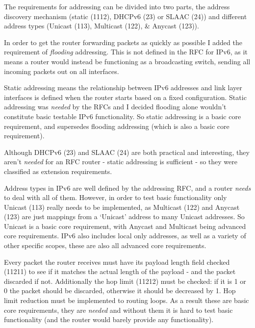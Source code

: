 \documentclass[12pt,a4paper,twoside,openany]{report}
\begin{document}
\bigskip

The requirements for addressing can be divided into two parts, the address discovery mechanism (static (1112), DHCPv6\cite{dhcpv6_rfc} (23) or SLAAC\cite{slaac_rfc} (24)) and different address types (Unicast (113), Multicast (122), \& Anycast (123)).  

In order to get the router forwarding packets as quickly as possible I added the requirement of \textit{flooding} addressing.  This is not defined in the RFC for IPv6, as it means a router would instead be functioning as a broadcasting switch, sending all incoming packets out on all interfaces.

Static addressing means the relationship between IPv6 addresses and link layer interfaces is defined when the router starts based on a fixed configuration.  Static addressing was \textit{needed} by the RFCs and I decided flooding alone wouldn't constitute basic testable IPv6 functionality. So static addressing is a basic core requirement, and supersedes flooding addressing (which is also a basic core requirement).

Although DHCPv6 (23) and SLAAC (24) are both practical and interesting, they aren't \textit{needed} for an RFC router - static addressing is sufficient - so they were classified as extension requirements.  

Address types in IPv6 are well defined by the addressing RFC\cite{ipv6_rfc_adr}, and a router \textit{needs} to deal with all of them.  However, in order to test basic functionality only Unicast (113) really needs to be implemented, as Multicast (122) and Anycast (123) are just mappings from a `Unicast' address to many Unicast addresses. So Unicast is a basic core requirement, with Anycast and Multicast being advanced core requirements. IPv6 also includes local only addresses, as well as a variety of other specific scopes, these are also all advanced core requirements.

\bigskip

Every packet the router receives must have its payload length field checked (11211) to see if it matches the actual length of the payload - and the packet discarded if not.  Additionally the hop limit (11212) must be checked: if it is 1 or 0 the packet should be discarded, otherwise it should be decreased by 1. Hop limit reduction must be implemented to routing loops. As a result these are basic core requirements, they are \textit{needed} and without them it is hard to test basic functionality (and the router would barely provide any functionality). 
\end{document}
